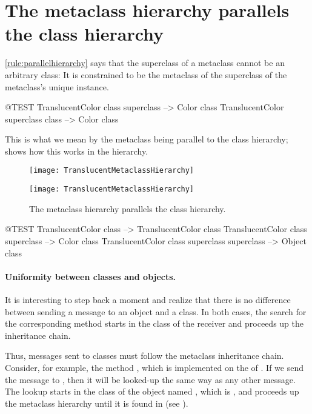 \documentclass[a4paper,10pt,twoside]{book}
\begin{document}
\section{The metaclass hierarchy parallels the class hierarchy}

\ref{rule:parallelhierarchy} says that the superclass of a metaclass cannot be an arbitrary class:
It is constrained to be the metaclass of the superclass of the metaclass's unique instance.

\begin{code}{@TEST}
TranslucentColor class superclass --> Color class
TranslucentColor superclass class --> Color class
\end{code}

\noindent
This is what we mean by the metaclass  being parallel to the class hierarchy;  shows how this works in the  hierarchy.

\begin{center}
\begin{figure}[!ht]
\ifluluelse
	{\centerline {\texttt{[image: TranslucentMetaclassHierarchy]}}}
	{\centerline {\texttt{[image: TranslucentMetaclassHierarchy]}}}
\caption{The metaclass hierarchy parallels the class hierarchy.\label{fig:parallelHierarchies}}
\end{figure}
\end{center}

\begin{code}{@TEST}
TranslucentColor class                                     --> TranslucentColor class
TranslucentColor class superclass                   --> Color class
TranslucentColor class superclass superclass --> Object class
\end{code}

\paragraph{Uniformity between classes and objects.}
It is interesting to step back a moment and realize that there is no difference between sending a message to an object and a class.
In both cases, the search for the corresponding method starts in the class of the receiver and proceeds up the inheritance chain.

Thus, messages sent to classes must follow the metaclass inheritance chain.
Consider, for example, the method , which is implemented on the  of .
If we send the message  to , then it will be looked-up the same way as any other message.
The lookup starts in the class of the object named , which is , and proceeds up the metaclass hierarchy until it is found in  (see ).
\end{document}

